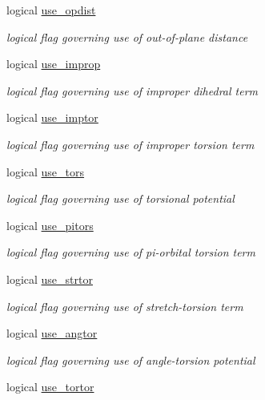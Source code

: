 \begin{DoxyCompactItemize}
logical \hyperlink{classpotent_a73b391b2ac5c8ca035e989745c1d4778}{use\-\_\-opdist}
\begin{DoxyCompactList}\small\item\em logical flag governing use of out-\/of-\/plane distance \end{DoxyCompactList}\item 
logical \hyperlink{classpotent_affab2bb5c07b079cb2f5b167baa6a994}{use\-\_\-improp}
\begin{DoxyCompactList}\small\item\em logical flag governing use of improper dihedral term \end{DoxyCompactList}\item 
logical \hyperlink{classpotent_a66a1f57b71ad896ee516a52931946dd5}{use\-\_\-imptor}
\begin{DoxyCompactList}\small\item\em logical flag governing use of improper torsion term \end{DoxyCompactList}\item 
logical \hyperlink{classpotent_a858f360374fa731c40259fb25072a2b8}{use\-\_\-tors}
\begin{DoxyCompactList}\small\item\em logical flag governing use of torsional potential \end{DoxyCompactList}\item 
logical \hyperlink{classpotent_add03f56b6452a9d6109285d8b9c41baa}{use\-\_\-pitors}
\begin{DoxyCompactList}\small\item\em logical flag governing use of pi-\/orbital torsion term \end{DoxyCompactList}\item 
logical \hyperlink{classpotent_a16df509b867b4c670a70473bd651ca73}{use\-\_\-strtor}
\begin{DoxyCompactList}\small\item\em logical flag governing use of stretch-\/torsion term \end{DoxyCompactList}\item 
logical \hyperlink{classpotent_aaf54bf6c5c9dd0284fb25717484e92ee}{use\-\_\-angtor}
\begin{DoxyCompactList}\small\item\em logical flag governing use of angle-\/torsion potential \end{DoxyCompactList}\item 
logical \hyperlink{classpotent_ac4ebdce0af0c3ba163b8862cc3bb9fb9}{use\-\_\-tortor}

\end{DoxyCompactItemize}
